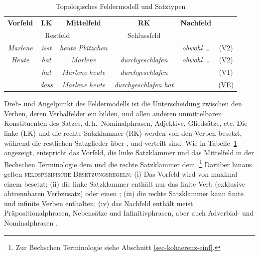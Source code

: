\begin{table}[t]
\begin{center}
\begin{tabular}{c|c|c|c|cc}
{\bf Vorfeld} & {\bf LK} & {\bf Mittelfeld} & {\bf RK} & {\bf Nachfeld} \\
\cline{1-5}
\multicolumn{3}{c|}{Restfeld} & Schlussfeld \\
\cline{1-5}
\cline{1-5}
{\it Marlene} & {\it isst} & {\it heute Plätzchen} & & {\it obwohl \ldots} & (V2) \\
{\it Heute} & {\it hat} & {\it Marlene} & {\it durchgeschlafen} & {\it obwohl \ldots} & (V2) \\
& {\it hat} & {\it Marlene} {\it heute} & {\it durchgeschlafen} & & (V1) \\
 & {\it dass} & {\it Marlene} {\it heute} & {\it durchgeschlafen} {\it hat} & & (VE) \\
\end{tabular}
\end{center}
\caption{\label{ex-feldermodell}Topologisches Feldermodell und Satztypen}
\end{table}

Dreh- und Angelpunkt des Feldermodells ist die Unterscheidung zwischen den Verben, deren Verbalfelder ein  bilden, und allen anderen unmittelbaren Konstituenten des Satzes, d.\,h.\ Nominalphrasen, Adjektive, Gliedsätze, etc. Die linke  (LK) und die rechte Satzklammer (RK) werden von den Verben besetzt, während die restlichen Satzglieder über ,  und  verteilt sind. Wie in Tabelle~\ref{ex-feldermodell} angezeigt, entspricht das Vorfeld, die linke Satzklammer und das Mittelfeld in der Bechschen Terminologie dem  und die rechte Satzklammer dem .\footnote{Zur Bechschen Terminologie siehe Abschnitt \ref{sec-kohaerenz-einf}.} Darüber hinaus gelten \textsc{feldspezifische Besetzungsregeln}: (i) Das Vorfeld wird von maximal einem  besetzt; (ii) die linke Satzklammer enthält nur das finite Verb (exklusive abtrennbaren Verbzusatz) oder einen ; (iii) die rechte Satzklammer kann finite und infinite Verben enthalten; (iv) das Nachfeld enthält meist Präpositionalphrasen, Nebensätze und Infinitivphrasen, aber auch Adverbial- und Nominalphrasen \citep[Kapitel~13]{Mueller:99}.

